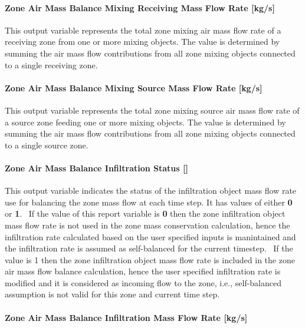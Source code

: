 \paragraph{Zone Air Mass Balance Mixing Receiving Mass Flow Rate {[}kg/s{]}}\label{zone-air-mass-balance-mixing-receiving-mass-flow-rate-kgs}

This output variable represents the total zone mixing air mass flow rate of a receiving zone from one or more mixing objects. The value is determined by summing the air mass flow contributions from all zone mixing objects connected to a single receiving zone.

\paragraph{Zone Air Mass Balance Mixing Source Mass Flow Rate {[}kg/s{]}}\label{zone-air-mass-balance-mixing-source-mass-flow-rate-kgs}

This output variable represents the total zone mixing source air mass flow rate of a source zone feeding one or more mixing objects. The value is determined by summing the air mass flow contributions from all zone mixing objects connected to a single source zone.

\paragraph{Zone Air Mass Balance Infiltration Status {[]}}\label{zone-air-mass-balance-infiltration-status}

This output variable indicates the status of the infiltration object mass flow rate use for balancing the zone mass flow at each time step. It has values of either \textbf{0} or \textbf{1}.~ If the value of this report variable is \textbf{0} then the zone infiltration object mass flow rate is not used in the zone mass conservation calculation, hence the infiltration rate calculated based on the user specified inputs is manintained and the infiltration rate is assumed as self-balanced for the current timestep.~ If the value is 1 then the zone infiltration object mass flow rate is included in the zone air mass flow balance calculation, hence the user specified infiltration rate is modified and it is considered as incoming flow to the zone, i.e., self-balanced assumption is not valid for this zone and current time step.

\paragraph{Zone Air Mass Balance Infiltration Mass Flow Rate {[}kg/s{]}}\label{zone-air-mass-balance-infiltration-mass-flow-rate-kgs}

